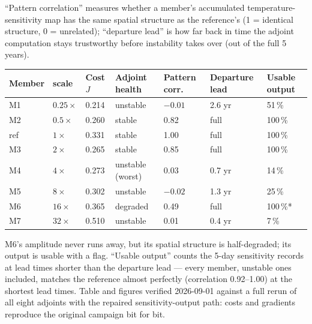``Pattern correlation'' measures whether a member's accumulated
temperature-sensitivity map has the same spatial structure as the
reference's (1 = identical structure, 0 = unrelated); ``departure lead''
is how far back in time the adjoint computation stays trustworthy before
instability takes over (out of the full 5 years).

\smallskip
\begin{tabularx}{\textwidth}{@{}lY{0.75}Y{0.75}Y{1.3}Y{1.2}Y{1.0}Y{1.0}@{}}
\toprule
\textbf{Member} & \textbf{\kv{} scale} & \textbf{Cost $J$}
 & \textbf{Adjoint health} & \textbf{Pattern corr.} & \textbf{Departure lead}
 & \textbf{Usable output}\\
\midrule
M1  & $0.25\times$ & 0.214 & unstable          & $-0.01$ & 2.6 yr & 51\,\%\\
M2  & $0.5\times$  & 0.260 & stable            & 0.82    & full   & 100\,\%\\
ref & $1\times$    & 0.331 & stable            & 1.00    & full   & 100\,\%\\
M3  & $2\times$    & 0.265 & stable            & 0.85    & full   & 100\,\%\\
M4  & $4\times$    & 0.273 & unstable (worst)  & 0.03    & 0.7 yr & 14\,\%\\
M5  & $8\times$    & 0.302 & unstable          & $-0.02$ & 1.3 yr & 25\,\%\\
M6  & $16\times$   & 0.365 & degraded          & 0.49    & full   & 100\,\%*\\
M7  & $32\times$   & 0.510 & unstable          & 0.01    & 0.4 yr & 7\,\%\\
\bottomrule
\end{tabularx}
\smallskip

{\small *M6's amplitude never runs away, but its spatial structure is
half-degraded; its output is usable with a flag. ``Usable output'' counts the
5-day sensitivity records at lead times shorter than the departure lead ---
every member, unstable ones included, matches the reference almost perfectly
(correlation 0.92--1.00) at the shortest lead times. Table and figures
verified 2026-09-01 against a full rerun of all eight adjoints with the
repaired sensitivity-output path: costs and gradients reproduce the original
campaign bit for bit.}
